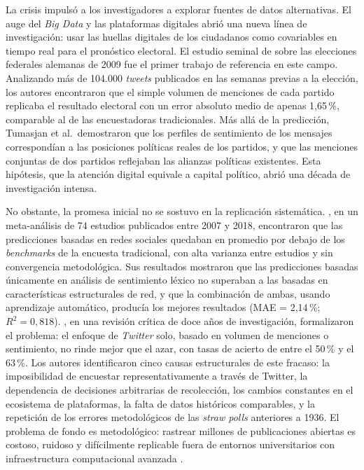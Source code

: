 La crisis impulsó a los investigadores a explorar fuentes de datos
alternativas. El auge del \textit{Big Data} y las plataformas digitales abrió
una nueva línea de investigación: usar las huellas digitales de los ciudadanos
como covariables en tiempo real para el pronóstico electoral. El estudio
seminal de \textcite{tumasjan2010} sobre las elecciones federales alemanas de
2009 fue el primer trabajo de referencia en este campo. Analizando más de
104.000 \textit{tweets} publicados en las semanas previas a la elección,
los autores encontraron que el simple volumen de menciones de cada partido
replicaba el resultado electoral con un error absoluto medio de apenas
1{,}65\,\%, comparable al de las encuestadoras tradicionales. Más allá de
la predicción, Tumasjan et al.\ demostraron que los perfiles de sentimiento
de los mensajes correspondían a las posiciones políticas reales de los
partidos, y que las menciones conjuntas de dos partidos reflejaban las
alianzas políticas existentes. Esta hipótesis, que la atención digital
equivale a capital político, abrió una década de investigación intensa.

No obstante, la promesa inicial no se sostuvo en la replicación sistemática.
\textcite{skoric2020}, en un meta-análisis de 74 estudios publicados entre
2007 y 2018, encontraron que las predicciones basadas en redes sociales
quedaban en promedio por debajo de los \textit{benchmarks} de la encuesta
tradicional, con alta varianza entre estudios y sin convergencia metodológica.
Sus resultados mostraron que las predicciones basadas únicamente en análisis
de sentimiento léxico no superaban a las basadas en características
estructurales de red, y que la combinación de ambas, usando aprendizaje
automático, producía los mejores resultados (MAE = 2{,}14\,\%;
$R^2 = 0{,}818$). \textcite{brito2024stop}, en una revisión crítica de doce
años de investigación, formalizaron el problema: el enfoque de
\textit{Twitter} solo, basado en volumen de menciones o sentimiento, no rinde
mejor que el azar, con tasas de acierto de entre el 50\,\% y el 63\,\%.
Los autores identificaron cinco causas estructurales de este fracaso: la
imposibilidad de encuestar representativamente a través de Twitter, la
dependencia de decisiones arbitrarias de recolección, los cambios constantes
en el ecosistema de plataformas, la falta de datos históricos comparables,
y la repetición de los errores metodológicos de las \textit{straw polls}
anteriores a 1936. El problema de fondo es metodológico: rastrear millones
de publicaciones abiertas es costoso, ruidoso y difícilmente replicable
fuera de entornos universitarios con infraestructura computacional avanzada
\parencite{skoric2020}.

